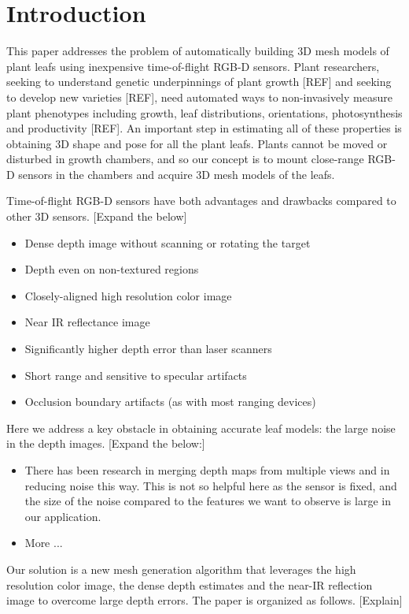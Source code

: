\section{Introduction}
\label{sec:intro}

This paper addresses the problem of automatically building $3$D mesh models of plant leafs using inexpensive time-of-flight RGB-D sensors.  Plant researchers, seeking to understand genetic underpinnings of plant growth [REF] and seeking to develop new varieties [REF], need automated ways to non-invasively measure plant phenotypes including growth, leaf distributions, orientations, photosynthesis and productivity [REF].  An important step in estimating all of these properties is obtaining $3$D shape and pose for all the plant leafs.  Plants cannot be moved or disturbed in growth chambers, and so our concept is to mount close-range RGB-D sensors in the chambers and acquire 3D mesh models of the leafs.

Time-of-flight RGB-D sensors have both advantages and drawbacks compared to other 3D sensors.  [Expand the below]
\begin{itemize}
\item Dense depth image without scanning or rotating the target
\item Depth even on non-textured regions
\item Closely-aligned high resolution color image
\item Near IR reflectance image
\item Significantly higher depth error than laser scanners
\item Short range and sensitive to specular artifacts
\item Occlusion boundary artifacts (as with most ranging devices)
\end{itemize}

Here we address a key obstacle in obtaining accurate leaf models: the large noise in the depth images. [Expand the below:]
\begin{itemize}
\item There has been research in merging depth maps from multiple views and in reducing noise this way.  This is not so helpful here as the sensor is fixed, and the size of the noise compared to the features we want to observe is large in our application.
\item More ...
\end{itemize}

Our solution is a new mesh generation algorithm that leverages the high resolution color image, the dense depth estimates and the near-IR reflection image to overcome large depth errors.  The paper is organized as follows. [Explain]

